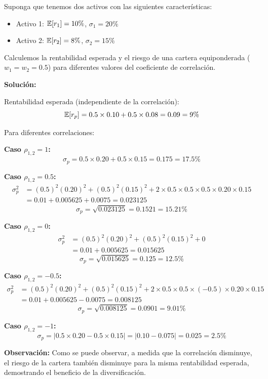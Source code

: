 \begin{ejemplo}
Suponga que tenemos dos activos con las siguientes características:
\begin{itemize}
\item Activo 1: $\mathbb{E}[r_1] = 10\%$, $\sigma_1 = 20\%$
\item Activo 2: $\mathbb{E}[r_2] = 8\%$, $\sigma_2 = 15\%$
\end{itemize}

Calculemos la rentabilidad esperada y el riesgo de una cartera equiponderada ($w_1 = w_2 = 0.5$) para diferentes valores del coeficiente de correlación.

\textbf{Solución:}

Rentabilidad esperada (independiente de la correlación):
$$\mathbb{E}[r_p] = 0.5 \times 0.10 + 0.5 \times 0.08 = 0.09 = 9\%$$

Para diferentes correlaciones:

\textbf{Caso $\rho_{1,2} = 1$:}
$$\sigma_p = 0.5 \times 0.20 + 0.5 \times 0.15 = 0.175 = 17.5\%$$

\textbf{Caso $\rho_{1,2} = 0.5$:}
\begin{align*}
\sigma_p^2 &= (0.5)^2 (0.20)^2 + (0.5)^2 (0.15)^2 + 2 \times 0.5 \times 0.5 \times 0.5 \times 0.20 \times 0.15 \\
&= 0.01 + 0.005625 + 0.0075 = 0.023125
\end{align*}
$$\sigma_p = \sqrt{0.023125} = 0.1521 = 15.21\%$$

\textbf{Caso $\rho_{1,2} = 0$:}
\begin{align*}
\sigma_p^2 &= (0.5)^2 (0.20)^2 + (0.5)^2 (0.15)^2 + 0 \\
&= 0.01 + 0.005625 = 0.015625
\end{align*}
$$\sigma_p = \sqrt{0.015625} = 0.125 = 12.5\%$$

\textbf{Caso $\rho_{1,2} = -0.5$:}
\begin{align*}
\sigma_p^2 &= (0.5)^2 (0.20)^2 + (0.5)^2 (0.15)^2 + 2 \times 0.5 \times 0.5 \times (-0.5) \times 0.20 \times 0.15 \\
&= 0.01 + 0.005625 - 0.0075 = 0.008125
\end{align*}
$$\sigma_p = \sqrt{0.008125} = 0.0901 = 9.01\%$$

\textbf{Caso $\rho_{1,2} = -1$:}
$$\sigma_p = |0.5 \times 0.20 - 0.5 \times 0.15| = |0.10 - 0.075| = 0.025 = 2.5\%$$

\textbf{Observación:} Como se puede observar, a medida que la correlación disminuye, el riesgo de la cartera también disminuye para la misma rentabilidad esperada, demostrando el beneficio de la diversificación.
\end{ejemplo}

